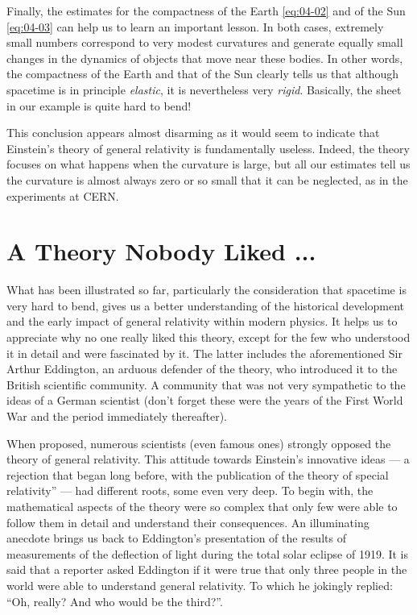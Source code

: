Finally, the estimates for the compactness of the Earth \eqref{eq:04-02} and of the Sun \eqref{eq:04-03} can
help us to learn an important lesson. In both cases, extremely small numbers correspond
to very modest curvatures and generate equally small changes in the dynamics of objects
that move near these bodies. In other words, the compactness of the Earth and that of
the Sun clearly tells us that although spacetime is in principle \emph{elastic}, it is
nevertheless very \emph{rigid}. Basically, the sheet in our example is quite hard to
bend!

This conclusion appears almost disarming as it would seem to indicate that Einstein's
theory of general relativity is fundamentally useless. Indeed, the theory focuses on
what happens when the curvature is large, but all our estimates tell us the curvature is
almost always zero or so small that it can be neglected, as in the experiments at
CERN.

\section{A Theory Nobody Liked ...}\label{sec:04-history}

What has been illustrated so far, particularly the consideration that spacetime is very
hard to bend, gives us a better understanding of the historical development and the
early impact of general relativity within modern physics. It helps us
to appreciate why no one really liked this theory, except for the few who understood it
in detail and were fascinated by it. The latter includes the aforementioned Sir Arthur
Eddington, an arduous defender of the theory, who introduced it to
the British scientific community. A community that was not very sympathetic to the ideas
of a German scientist (don't forget these were the years of the First World War and the
period immediately thereafter).

When proposed, numerous scientists (even famous ones) strongly opposed the theory of
general relativity. This attitude towards Einstein's innovative ideas --- a rejection
that began long before, with the publication of the theory of special
relativity'' --- had different roots, some even very deep. To begin
with, the mathematical aspects of the theory were so complex that only few were able to
follow them in detail and understand their consequences. An illuminating anecdote brings
us back to Eddington's presentation of the results of measurements of
the deflection of light during the total solar eclipse of 1919. It is
said that a reporter asked Eddington if it were true that only three
people in the world were able to understand general relativity. To
which he jokingly replied: ``Oh, really? And who would be the third?''.

